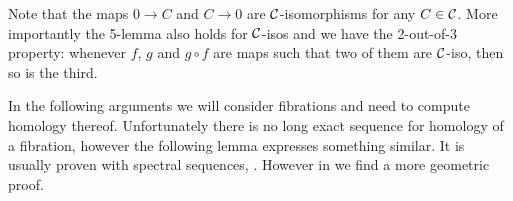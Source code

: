 
Note that the maps $0 \to C$ and $C \to 0$ are $\mathcal{C}$-isomorphisms for any $C \in \mathcal{C}$. More importantly the 5-lemma also holds for $\mathcal{C}$-isos and we have the 2-out-of-3 property: whenever $f$, $g$ and $g \circ f$ are maps such that two of them are $\mathcal{C}$-iso, then so is the third.

In the following arguments we will consider fibrations and need to compute homology thereof. Unfortunately there is no long exact sequence for homology of a fibration, however the following lemma expresses something similar. It is usually proven with spectral sequences,  \cite[Ch. 2 Thm 1]{serre}. However in \cite{kreck} we find a more geometric proof.

